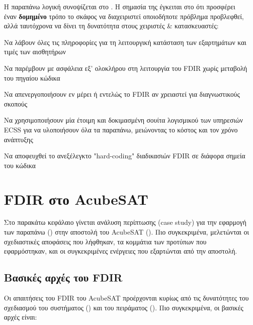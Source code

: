 \documentclass[a4paper,nobib]{tufte-book}
\begin{document}
Η παραπάνω λογική συνοψίζεται στο . Η σημασία της έγκειται στο ότι προσφέρει έναν \textbf{δομημένο} τρόπο το σκάφος να διαχειριστεί οποιοδήποτε πρόβλημα προβλεφθεί, αλλά ταυτόχρονα να δίνει τη δυνατότητα στους χειριστές \& κατασκευαστές:
\begin{compactitem}
	\item Να λάβουν όλες τις πληροφορίες για τη λειτουργική κατάσταση των εξαρτημάτων και τιμές των αισθητήρων
	\item Να παρέμβουν με ασφάλεια εξ' ολοκλήρου στη λειτουργία του \acs{FDIR} χωρίς μεταβολή του πηγαίου κώδικα
	\item Να απενεργοποιήσουν εν μέρει ή εντελώς το \acs{FDIR} αν χρειαστεί για διαγνωστικούς σκοπούς
	\item Να χρησιμοποιήσουν μία έτοιμη και δοκιμασμένη σουίτα λογισμικού των υπηρεσιών \acs{ECSS} για να υλοποιήσουν όλα τα παραπάνω, μειώνοντας το κόστος και τον χρόνο ανάπτυξης
	\item Να αποφευχθεί το ανεξέλεγκτο "hard-coding" διαδικασιών \acs{FDIR} σε διάφορα σημεία του κώδικα
\end{compactitem}


\chapter{\ac{FDIR} στο AcubeSAT}
\label{cap:acufdir}

Στο παρακάτω κεφάλαιο γίνεται ανάλυση περίπτωσης (case study) για την εφαρμογή των παραπάνω () στην αποστολή του AcubeSAT (). Πιο συγκεκριμένα, μελετώνται οι σχεδιαστικές αποφάσεις που λήφθηκαν, τα κομμάτια των προτύπων που εφαρμόστηκαν, και οι συγκεκριμένες ενέργειες που εξαρτώνται από την αποστολή. \parencite{FMEA}

\section{Βασικές αρχές του \ac{FDIR}}
\label{sec:fdirbaspri}

Οι απαιτήσεις του \acs{FDIR} του AcubeSAT προέρχονται κυρίως από τις δυνατότητες του σχεδιασμού του συστήματος () και του πειράματος (). Πιο συγκεκριμένα, οι βασικές αρχές είναι:
\end{document}
